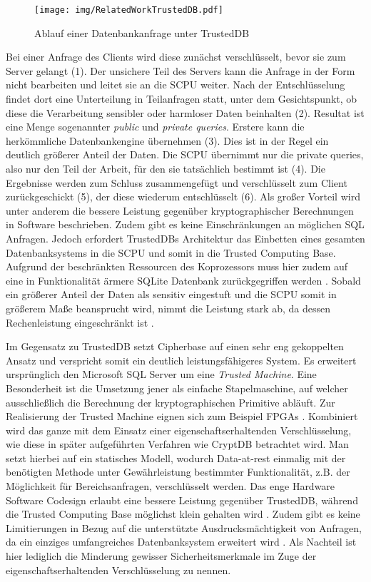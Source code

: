 \begin{figure}[h]
	\texttt{[image: img/RelatedWorkTrustedDB.pdf]}
	\centering
	\caption{Ablauf einer Datenbankanfrage unter TrustedDB}
	\label{fig:trusteddb}
\end{figure}

Bei einer Anfrage des Clients wird diese zunächst verschlüsselt, bevor sie zum Server gelangt (1). Der unsichere Teil des Servers kann die Anfrage in der Form nicht bearbeiten und leitet sie an die SCPU weiter. Nach der Entschlüsselung findet dort eine Unterteilung in Teilanfragen statt, unter dem Gesichtspunkt, ob diese die Verarbeitung sensibler oder harmloser Daten beinhalten (2). Resultat ist eine Menge sogenannter \textit{public} und \textit{private queries}. Erstere kann die herkömmliche Datenbankengine übernehmen (3). Dies ist in der Regel ein deutlich größerer Anteil der Daten. Die SCPU übernimmt nur die private queries, also nur den Teil der Arbeit, für den sie tatsächlich bestimmt ist (4). Die Ergebnisse werden zum Schluss zusammengefügt und verschlüsselt zum Client zurückgeschickt (5), der diese wiederum entschlüsselt (6). Als großer Vorteil wird unter anderem die bessere Leistung gegenüber kryptographischer Berechnungen in Software beschrieben. Zudem gibt es keine Einschränkungen an möglichen SQL Anfragen. Jedoch erfordert TrustedDBs Architektur das Einbetten eines gesamten Datenbanksystems in die SCPU und somit in die Trusted Computing Base. Aufgrund der beschränkten Ressourcen des Koprozessors muss hier zudem auf eine in Funktionalität ärmere SQLite Datenbank zurückgegriffen werden \cite{Arasu}. Sobald ein größerer Anteil der Daten als sensitiv eingestuft und die SCPU somit in größerem Maße beansprucht wird, nimmt die Leistung stark ab, da dessen Rechenleistung eingeschränkt ist \cite{Arasu2012}.

Im Gegensatz zu TrustedDB setzt Cipherbase \cite{Arasu2012}\cite{Arasu} auf einen sehr eng gekoppelten Ansatz und verspricht somit ein deutlich leistungsfähigeres System. Es erweitert ursprünglich den Microsoft SQL Server um eine \textit{Trusted Machine}. Eine Besonderheit ist die Umsetzung jener als einfache Stapelmaschine, auf welcher ausschließlich die Berechnung der kryptographischen Primitive abläuft. Zur Realisierung der Trusted Machine eignen sich zum Beispiel FPGAs \cite{Arasu}. Kombiniert wird das ganze mit dem Einsatz einer eigenschaftserhaltenden Verschlüsselung, wie diese in später aufgeführten Verfahren wie CryptDB betrachtet wird. Man setzt hierbei auf ein statisches Modell, wodurch Data-at-rest einmalig mit der benötigten Methode unter Gewährleistung bestimmter Funktionalität, z.B. der Möglichkeit für Bereichsanfragen, verschlüsselt werden. Das enge Hardware Software Codesign erlaubt eine bessere Leistung gegenüber TrustedDB, während die Trusted Computing Base möglichst klein gehalten wird \cite{Arasu}. Zudem gibt es keine Limitierungen in Bezug auf die unterstützte Ausdrucksmächtigkeit von Anfragen, da ein einziges umfangreiches Datenbanksystem erweitert wird \cite{Arasu2013}. Als Nachteil ist hier lediglich die Minderung gewisser Sicherheitsmerkmale im Zuge der eigenschaftserhaltenden Verschlüsselung zu nennen.

